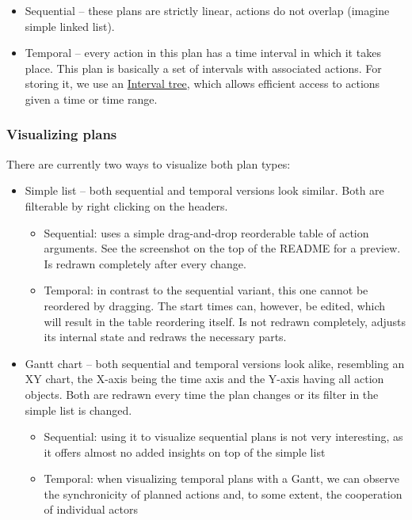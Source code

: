 \begin{itemize}
\item Sequential -- these plans are strictly linear, actions do not overlap (imagine simple linked list).
\item Temporal -- every action in this plan has a time interval in which it takes place.
This plan is basically a set of intervals with associated actions. For storing it, we use an
\href{https://en.wikipedia.org/wiki/Interval_tree}{Interval tree},
which allows efficient access to actions given a time or time range.
\end{itemize}

\subsubsection*{Visualizing plans}

There are currently two ways to visualize both plan types:

\begin{itemize}
\item Simple list -- both sequential and temporal versions look similar. Both are filterable by right clicking on the headers.
\begin{itemize}
\item Sequential: uses a simple drag-and-drop reorderable table of action arguments.
See the screenshot on the top of the README for a preview. Is redrawn completely after every change.

\item Temporal: in contrast to the sequential variant, this one cannot be reordered by dragging. The start times can, however,
be edited, which will result in the table reordering itself. Is not redrawn completely, adjusts its internal state and
redraws the necessary parts.
\end{itemize}

\item Gantt chart -- both sequential and temporal versions look alike, resembling an XY chart, the X-axis being the time
axis and the Y-axis having all action objects. Both are redrawn every time the plan changes or its filter
in the simple list is changed.
\begin{itemize}
\item Sequential: using it to visualize sequential plans is not very interesting, as it offers almost no added insights on top of the simple list

\item Temporal: when visualizing temporal plans with a Gantt, we can observe the synchronicity of planned actions
and, to some extent, the cooperation of individual actors
\end{itemize}
\end{itemize}

